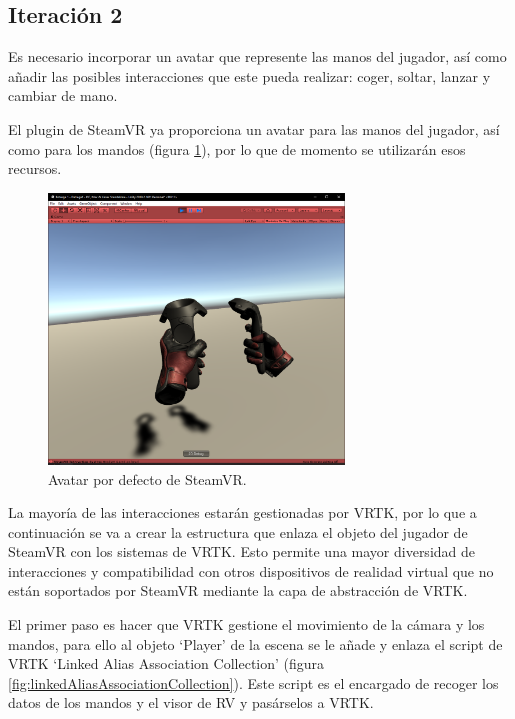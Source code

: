 
\subsection{Iteración 2}

Es necesario incorporar un avatar que represente las manos del jugador, así como añadir las posibles interacciones que este pueda realizar: coger, soltar, lanzar y cambiar de mano.

El plugin de SteamVR ya proporciona un avatar para las manos del jugador, así como para los mandos (figura \ref{fig:manos}), por lo que de momento se utilizarán esos recursos. 

\begin{figure}
  \centering
    \includegraphics[width=0.7\textwidth]{04.Desarrollo/01.Entrega1/02.Iteracion1_2/00.Figuras/01.manos.png}
    \caption{Avatar por defecto de SteamVR.}
    \label{fig:manos}
\end{figure}


La mayoría de las interacciones estarán gestionadas por VRTK, por lo que a continuación se va a crear la estructura que enlaza el objeto del jugador de SteamVR con los sistemas de VRTK. Esto permite una mayor diversidad de interacciones y compatibilidad con otros dispositivos de realidad virtual que no están soportados por SteamVR mediante la capa de abstracción de VRTK.

El primer paso es hacer que VRTK gestione el movimiento de la cámara y los mandos, para ello al objeto ‘Player’ de la escena se le añade y enlaza el script de VRTK ‘Linked Alias Association Collection’ (figura \ref{fig:linkedAliasAssociationCollection}). Este script es el encargado de recoger los datos de los mandos y el visor de RV y pasárselos a VRTK.

